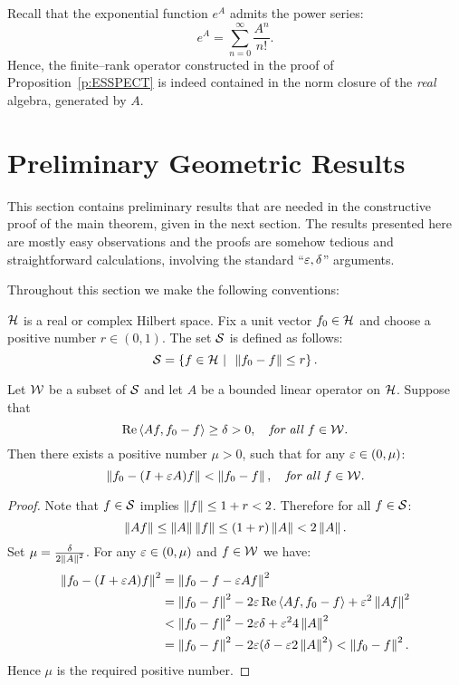 \begin{rem}
Recall that the exponential function $e^A$ admits the power series:
\[ e^A = \sum_{n=0}^{\infty} \frac{A^n}{n!}. \]
Hence, the finite--rank operator constructed in the proof of
Proposition~\ref{p:ESSPECT} is indeed contained in the norm closure of the
{\em real} algebra, generated by $A$.
\end{rem}

\goodbreak
\section{Preliminary Geometric Results}

{
\def\baselinestretch{1.6}

This section contains preliminary results that are needed in the constructive
proof of the main theorem, given in the next section. The results presented
here are mostly easy observations and the proofs are somehow tedious and
straightforward calculations, involving the standard ``$\varepsilon,\delta$''
arguments.

\smallskip

Throughout this section we make the following conventions:

${\cal H}$ is a real or complex Hilbert space. Fix a unit vector $f_0\in{\cal H}$ and
choose a positive number $r\in(0,1)$. The set ${\cal S}$ is defined as follows:
\[ {\cal S} = \left\{f\in{\cal H}\,\,|\,\,\, \left\Vert f_0-f\right\Vert\leq r\right\}. \]

\begin{lem} \label{l:APPROX}
Let ${\cal W}$ be a subset of ${\cal S}$ and let $A$ be a bounded linear operator on
${\cal H}$. Suppose that
\[ \operatorname{Re}\left<A{}f,f_0-f\right>\geq\delta>0, \quad \text{\em for all $f\in{\cal W}$.} \]
Then there exists a positive number $\mu>0$, such that for any
$\varepsilon\in(0,\mu)$:
\[ \left\Vert f_0 - (I+\varepsilon A)f\right\Vert < \left\Vert f_0 - f\right\Vert,
   \quad \text{\em for all $f\in{\cal W}$.} \]
\end{lem}

\begin{proof}
Note that $f\in{\cal S}$ implies $\left\Vert f\right\Vert \leq 1 + r < 2$. Therefore for all
$f\in{\cal S}$:
\[ \left\Vert A{}f\right\Vert \leq \left\Vert A\right\Vert\left\Vert f\right\Vert \leq (1+r) \left\Vert A\right\Vert < 2\left\Vert A\right\Vert. \]
Set $\mu=\tfrac{\delta}{2\left\Vert A\right\Vert^2}$. For any $\varepsilon\in(0,\mu)$ and $f\in{\cal W}$
we have:
\begin{equation*}
  \begin{split}
    \left\Vert f_0 - (I+\varepsilon A)f\right\Vert^2 &= \left\Vert f_0-f - \varepsilon A f\right\Vert^2 \\
     & = \left\Vert f_0-f\right\Vert^2 - 2\varepsilon\operatorname{Re}\left<A{}f,f_0-f\right> + \varepsilon^2\left\Vert A{}f\right\Vert^2 \\
     & < \left\Vert f_0-f\right\Vert^2 - 2\varepsilon\delta + \varepsilon^2 4\left\Vert A\right\Vert^2 \\
     & = \left\Vert f_0-f\right\Vert^2 - 2\varepsilon(\delta - \varepsilon 2\left\Vert A\right\Vert^2) < \left\Vert f_0-f\right\Vert^2.
  \end{split}
\end{equation*}
Hence $\mu$ is the required positive number.
\end{proof}

\def\baselinestretch{1.66}
}

